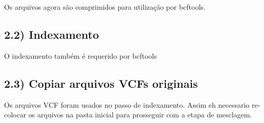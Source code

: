 \documentclass[
]{article}
\newenvironment{Shaded}{\begin{snugshade}}{\end{snugshade}}
\newcommand{\ExtensionTok}[1]{#1}
\newcommand{\FunctionTok}[1]{\textcolor[rgb]{0.00,0.00,0.00}{#1}}
\newcommand{\KeywordTok}[1]{\textcolor[rgb]{0.13,0.29,0.53}{\textbf{#1}}}
\newcommand{\NormalTok}[1]{#1}
\newcommand{\StringTok}[1]{\textcolor[rgb]{0.31,0.60,0.02}{#1}}
\newcommand{\VariableTok}[1]{\textcolor[rgb]{0.00,0.00,0.00}{#1}}
\begin{document}
Os arquivos agora são comprimidos para utilização por bcftools.

\begin{Shaded}
\end{Shaded}

\hypertarget{indexamento}{%
\subsection{2.2) Indexamento}\label{indexamento}}

O indexamento também é requerido por bcftools

\begin{Shaded}
\end{Shaded}

\hypertarget{copiar-arquivos-vcfs-originais}{%
\subsection{2.3) Copiar arquivos VCFs
originais}\label{copiar-arquivos-vcfs-originais}}

Os arquivos VCF foram usados no passo de indexamento. Assim eh
necessario re-colocar os arquivos na pasta inicial para prosseguir com a
etapa de mesclagem.

\begin{Shaded}
\end{Shaded}
\end{document}
